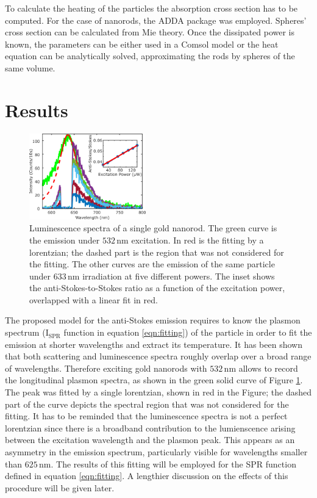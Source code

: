 \documentclass[journal=nalefd,manuscript=letter]{achemso}
\newcommand{\nm}{\ensuremath{\,\textrm{nm}}}
\begin{document}
To calculate the heating of the particles the absorption cross section has to be
computed. For the case of nanorods, the ADDA package was employed. Spheres'
cross section can be calculated from Mie theory. Once the dissipated power is
known, the parameters can be either used in a Comsol model or the
heat equation can be analytically solved, approximating the rods by spheres of
the same volume.

\section{Results}
\begin{figure}[htp] \centering
\includegraphics[width=0.45\textwidth]{Figures/02_Several_Intensities/02_several_intensities.png}
\caption{Luminescence spectra of a single gold nanorod. The green curve is the
emission under $532\nm$ excitation. In red is the fitting by a lorentzian; the
dashed part is the region that was not considered for the fitting. The other
curves are the emission of the same particle under $633\nm$ irradiation at five 
different powers. The inset shows the anti-Stokes-to-Stokes ratio as a function
of the excitation power, overlapped with a linear fit in red.}
	\label{fig:spectra_rod}
\end{figure}

The proposed model for the anti-Stokes emission requires to know the plasmon
spectrum ($\textrm{I}_{\textrm{SPR}}$ function in equation \ref{eqn:fitting}) of
the particle in order to fit the emission at shorter wavelengths and extract its
temperature. It has been shown that both scattering and luminescence spectra
roughly overlap over a broad range of wavelengths\cite{Yorulmaz2012}. Therefore
exciting gold nanorods with $532\nm$ allows to record the longitudinal plasmon
spectra, as shown in the green solid curve of Figure \ref{fig:spectra_rod}. The
peak was fitted by a single lorentzian, shown in red in the Figure; the dashed
part of the curve depicts the spectral region that was not considered for the
fitting. It has to be reminded that the luminescence spectra is not a perfect
lorentzian since there is a broadband contribution to the lumienscence arising
between the excitation wavelength and the plasmon peak\cite{Boyd1986}. This
appears as an asymmetry in the emission spectrum, particularly visible for
wavelengths smaller than $625\nm$. The results of this fitting will be employed
for the SPR function defined in equation \ref{eqn:fitting}. A lengthier
discussion on the effects of this procedure will be given later.
\end{document}
